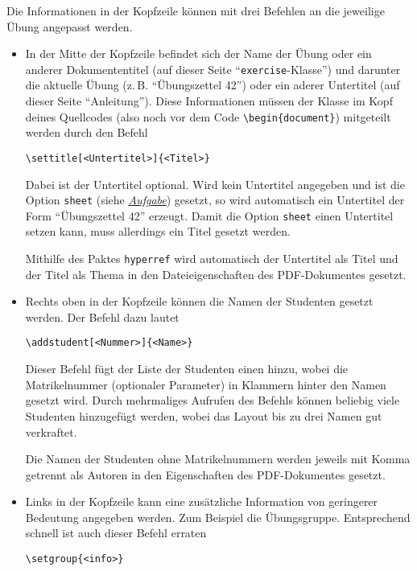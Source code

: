 \documentclass{exercise}
\begin{document}
  \label{section-kopfzeile}
    Die Informationen in der Kopfzeile können mit drei Befehlen an die
    jeweilige Übung angepasst werden.
    \begin{itemize}
      \item In der Mitte der Kopfzeile befindet sich der Name der Übung oder
      ein anderer Dokumententitel (auf dieser Seite
      \enquote{\texttt{exercise}-Klasse}) und darunter die aktuelle Übung
      (z.\,B. \enquote{Übungszettel 42}) oder ein aderer Untertitel (auf dieser
      Seite \enquote{Anleitung}). Diese Informationen müssen der Klasse im Kopf
      deines Quellcodes (also noch vor dem Code \lstinline-\begin{document}-) mitgeteilt
      werden durch den Befehl
        \begin{lstlisting}[gobble=10]
          \settitle[<Untertitel>]{<Titel>}
        \end{lstlisting}

        Dabei ist der Untertitel optional. Wird kein Untertitel angegeben und
        ist die Option \lstinline{sheet} (siehe
        \hyperref[section-aufgaben]{\emph{Aufgabe}}) gesetzt, so wird
        automatisch ein Untertitel der Form \enquote{Übungszettel 42} erzeugt.
        Damit die Option \lstinline{sheet} einen Untertitel setzen kann, muss
        allerdings ein Titel gesetzt werden.

        Mithilfe des Paktes \texttt{hyperref} \cite{hyperref} wird automatisch der Untertitel als Titel und der Titel als Thema in den Dateieigenschaften des PDF-Dokumentes gesetzt.

      \item Rechts oben in der Kopfzeile können die Namen der Studenten gesetzt werden. Der Befehl dazu lautet
      \begin{lstlisting}[gobble=8]
        \addstudent[<Nummer>]{<Name>}
      \end{lstlisting}
      Dieser Befehl fügt der Liste der Studenten einen hinzu, wobei die Matrikelnummer (optionaler Parameter) in Klammern hinter den Namen gesetzt wird. Durch mehrmaliges Aufrufen des Befehls können beliebig viele Studenten hinzugefügt werden, wobei das Layout bis zu drei Namen gut verkraftet.

      Die Namen der Studenten ohne Matrikelnummern werden jeweils mit Komma getrennt als Autoren in den Eigenschaften des PDF-Dokumentes gesetzt.

      \item Links in der Kopfzeile kann eine zusätzliche Information von geringerer Bedeutung angegeben werden. Zum Beispiel die Übungsgruppe. Entsprechend schnell ist auch dieser Befehl erraten
        \begin{lstlisting}[gobble=10]
          \setgroup{<info>}
        \end{lstlisting}
    \end{itemize}
\end{document}
